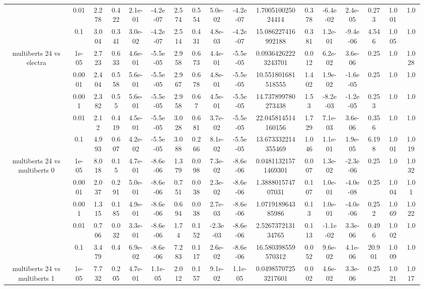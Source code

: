 \begin{tabular}{|c|c|c|c|c|c|c|c|c|c|c|c|c|c|c|c|c|}
 & 0.01 & 2.278 & 0.422 & 2.1e-01 & -4.2e-07 & 2.574 & 0.554 & 5.0e-02 & -4.2e-07 & 1.700510025024414 & 0.378 & -6.4e-02 & 2.4e-05 & 0.273 & 1.001 & 1.0 \\
 & 0.1 & 3.004 & 0.341 & 3.0e-02 & -4.2e-07 & 2.514 & 0.431 & 4.8e-03 & -4.2e-07 & 15.086227416992188 & 0.381 & 1.2e-01 & -9.4e-06 & 4.546 & 1.005 & 1.0 \\
\hline
\multirow{5}{*}{multiberts 24 vs electra } & 1e-05 & 2.723 & 0.633 & 4.6e-01 & -5.5e-05 & 2.958 & 0.673 & 4.4e-01 & -5.5e-05 & 0.09364262223243701 & 0.012 & 6.2e-02 & 3.6e-06 & 0.25 & 1.0 & 1.028 \\
 & 0.0001 & 2.404 & 0.558 & 5.6e-01 & -5.5e-05 & 2.967 & 0.678 & 4.8e-01 & -5.5e-05 & 10.551801681518555 & 1.402 & 1.9e-02 & -1.6e-05 & 0.25 & 1.0 & 1.0 \\
 & 0.001 & 2.382 & 0.55 & 5.6e-01 & -5.5e-05 & 2.958 & 0.67 & 4.5e-01 & -5.5e-05 & 14.737899780273438 & 1.53 & -8.2e-03 & -1.2e-05 & 0.253 & 1.0 & 1.0 \\
 & 0.01 & 2.12 & 0.419 & 4.5e-01 & -5.5e-05 & 3.028 & 0.681 & 3.7e-02 & -5.5e-05 & 22.045814514160156 & 1.729 & 7.1e-03 & 3.6e-06 & 0.356 & 1.0 & 1.0 \\
 & 0.1 & 4.993 & 0.607 & 4.2e-02 & -5.5e-05 & 3.088 & 0.266 & 8.1e-02 & -5.5e-05 & 13.673332214355469 & 1.046 & 1.1e-01 & 1.9e-05 & 6.198 & 1.001 & 1.019 \\
\hline
\multirow{5}{*}{multiberts 24 vs multiberts 0} & 1e-05 & 8.018 & 0.15 & 4.7e-01 & -8.6e-06 & 1.379 & 0.098 & 7.3e-02 & -8.6e-06 & 0.04811321571469301 & 0.007 & 1.3e-02 & -2.3e-06 & 0.25 & 1.0 & 1.032 \\
 & 0.0001 & 2.037 & 0.291 & 5.0e-01 & -8.6e-06 & 0.751 & 0.038 & 2.3e-02 & -8.6e-06 & 1.388801574707031 & 0.107 & 1.0e-01 & -4.0e-08 & 0.25 & 1.004 & 1.01 \\
 & 0.001 & 1.315 & 0.185 & 4.9e-01 & -8.6e-06 & 0.694 & 0.038 & 2.7e-03 & -8.6e-06 & 1.071918964385986 & 0.13 & 1.0e-01 & -4.0e-06 & 0.252 & 1.069 & 1.022 \\
 & 0.01 & 0.706 & 0.032 & 3.3e-01 & -8.6e-06 & 1.74 & 0.152 & -2.3e-03 & -8.6e-06 & 2.526737213134765 & 0.113 & -1.1e-02 & 3.3e-06 & 0.496 & 1.002 & 1.0 \\
 & 0.1 & 3.479 & 0.4 & 6.9e-02 & -8.6e-06 & 7.283 & 0.117 & 2.6e-02 & -8.6e-06 & 16.580398559570312 & 0.052 & 9.6e-02 & 4.1e-06 & 20.901 & 1.009 & 1.0 \\
\hline
\multirow{5}{*}{multiberts 24 vs multiberts 1} & 1e-05 & 7.732 & 0.205 & 4.7e-01 & 1.1e-05 & 2.012 & 0.157 & 9.1e-02 & 1.1e-05 & 0.04985707253217601 & 0.002 & 4.6e-02 & 3.3e-06 & 0.25 & 1.021 & 1.017 \\

\end{tabular}
